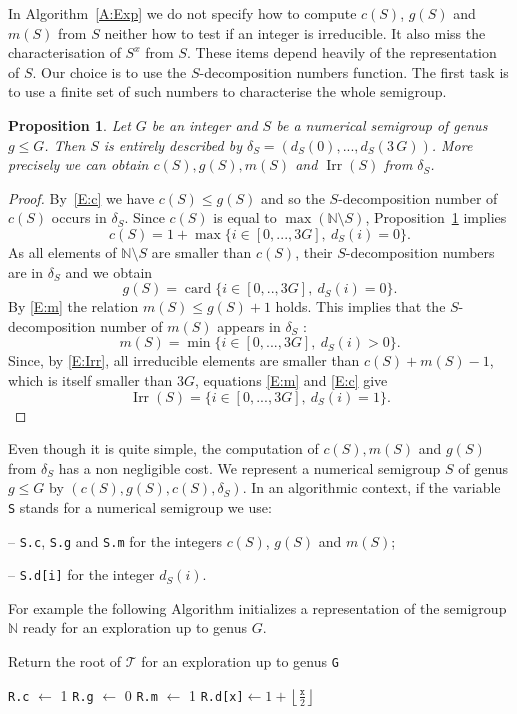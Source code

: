 \documentclass[reqno,11pt]{amsart}
\theoremstyle{plain}
\newtheorem{prop}{Proposition}[section]
\theoremstyle{definition}
\renewcommand{\leq}{\leqslant}
\newcommand{\NN}{\mathbb{N}}
\renewcommand{\tt}[1]{\texttt{#1}}
\DeclareMathOperator{\Irr}{Irr}
\DeclareMathOperator{\card}{card}
\begin{document}
In Algorithm~\ref{A:Exp} we do not specify how to compute $c(S)$, $g(S)$ and $m(S)$  from $S$ neither how to test if an integer is irreducible. 
It also miss  the characterisation of $S^x$ from $S$.
These items depend heavily of the representation of $S$.
Our choice is to use the $S$-decomposition numbers function. 
The first task is to use a finite set of such numbers to characterise the whole semigroup.

\begin{prop}
\label{P:delta}
Let $G$ be an integer and $S$ be a numerical semigroup of genus $g\leq G$.
Then $S$ is entirely described by $\delta_S=(d_S(0),...,d_S(3\,G))$. More precisely we can obtain $c(S), g(S), m(S)$ and $\Irr(S)$ from $\delta_S$.
\end{prop} 

\begin{proof}
By~\eqref{E:c} we have $c(S)\leq g(S)$ and so the $S$-decomposition number of $c(S)$ occurs in $\delta_S$.
Since $c(S)$ is equal to $\max(\NN\setminus S)$, Proposition~\ref{P:delta} implies 
\[
c(S)=1+\max\{i\in[0,...,3G],\ d_S(i)=0\}.
\]
As all elements of $\NN\setminus S$ are smaller than $c(S)$, their $S$-decomposition numbers are in $\delta_S$ and we obtain
\[
g(S)=\card\{i\in[0,..,3G],\ d_S(i)=0\}.
\]
By \eqref{E:m} the relation $m(S)\leq g(S)+1$ holds. 
This implies that the $S$-decomposition number of $m(S)$ appears in $\delta_S$ : 
\[
m(S)=\min\{i\in[0,...,3G],\ d_S(i)>0\}.
\]
Since, by \eqref{E:Irr},  all irreducible elements are smaller than $c(S)+m(S)-1$, which is itself smaller than $3G$, equations  \eqref{E:m} and \eqref{E:c} give
\[
\Irr(S)=\{i\in[0,...,3G],\ d_S(i)=1\}.
\]
\end{proof}

Even though it is quite simple, the computation of $c(S),m(S)$ and $g(S)$ from $\delta_S$ has a non negligible cost.
We represent a numerical semigroup $S$ of genus $g\leq G$ by $(c(S),g(S),c(S),\delta_S)$. 
In an algorithmic context, if the variable \texttt{S} stands for a numerical semigroup  we use:

-- \tt{S.c}, \tt{S.g} and \tt{S.m} for the integers $c(S)$, $g(S)$ and $m(S)$;

-- \tt{S.d[i]} for the integer $d_S(i)$.

For example the following Algorithm initializes a representation of the semigroup $\NN$ ready for an exploration up to genus $G$.

\begin{algorithm}
\caption{Return the root of $\mathcal{T}$ for an exploration up to genus \tt{G}}\label{A:Root}
\begin{algorithmic}
\Function{Root}{\tt{G}}
\State \tt{R.c} $\gets$ 1 \Comment{\tt{R} stands for $\NN$}
\State \tt{R.g} $\gets$ 0
\State \tt{R.m} $\gets$ 1 
\For{\tt{x} from $1$ to $3\,\tt{G}$}
	\State\tt{R.d[x]}$\gets1+\left\lfloor\frac{\tt{x}}2\right\rfloor$
\EndFor
\State{\textbf{return} \tt{R}}
\EndFunction
\end{algorithmic}
\end{algorithm}
\end{document}
